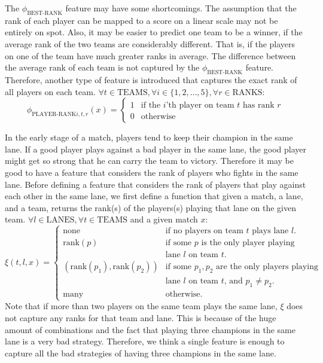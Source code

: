 The $\phi_\text{BEST-RANK}$ feature may have some shortcomings. The assumption that the rank of each player can be mapped to a score on a linear scale may not be entirely on spot.
Also, it may be easier to predict one team to be a winner, if the average rank of the two teams are considerably different. That is, if the players on one of the team have much greater ranks in average. The difference between the average rank of each team is not captured by the $\phi_\text{BEST-RANK}$ feature.
Therefore, another type of feature is introduced that captures the exact rank of all players on each team.
$\forall t \in \text{TEAMS}, \forall i \in \{1,2,\dots,5\}, \forall r \in \text{RANKS}$:
\begin{equation}\label{eq:playerrank}
\phi_{\text{PLAYER-RANK}i,t,r}(x) = 
\begin{cases} 
  1 & \text{if the } i \text{'th player on team } t \text{ has rank } r\\
  0 & \text{otherwise} 
\end{cases}  
\end{equation}

In the early stage of a match, players tend to keep their champion in the same lane.
If a good player plays against a bad player in the same lane, the good player might get so strong that he can carry the team to victory.
Therefore it may be good to have a feature that considers the rank of players who fights in the same lane.
Before defining a feature that considers the rank of players that play against each other in the same lane,
we first define a function that given a match, a lane, and a team, returns the rank(s) of the players(s) playing that lane on the given team.
$\forall l \in \text{LANES}, \forall t \in \text{TEAMS}$ and a given match $x$:
\begin{equation}\label{eq:xi}
  \xi(t,l,x) =
\begin{cases} 
  \text{none} & \text{if no players on team } t \text{ plays lane } l \text{.}\\
  \text{rank}(p) & \text{if some } p \text{ is the only player playing}\\
  & \text{lane } l \text{ on team } t.\\
  (\text{rank}(p_1), \text{rank}(p_2)) & \text{if some } p_1, p_2 \text{ are the only players playing}\\
                        & \text{lane }l \text{ on team } t \text{, and } p_1 \neq p_2.\\
  \text{many} & \text{otherwise}.
\end{cases}
\end{equation}
Note that if more than two players on the same team plays the same lane, $\xi$ does not capture any ranks for that team and lane. This is because of the huge amount of combinations and the fact that playing three champions in the same lane is a very bad strategy. Therefore, we think a single feature is enough to capture all the bad strategies of having three champions in the same lane.
 
